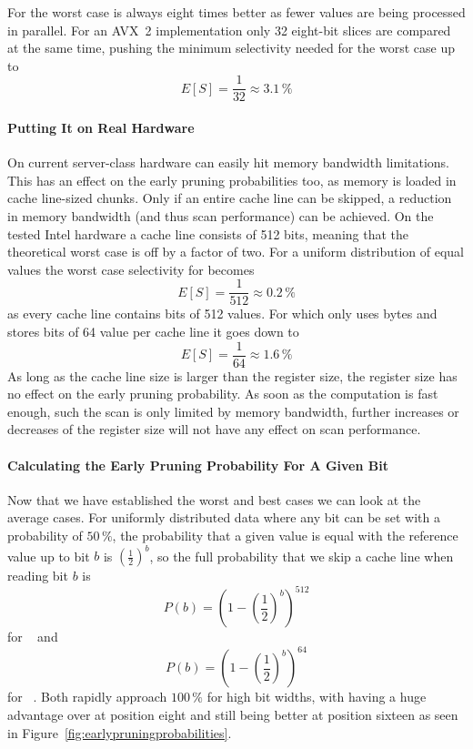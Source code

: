 For \bs{} the worst case is always eight times better as fewer values are being
processed in parallel. For an AVX~2 implementation only 32 eight-bit slices are
compared at the same time, pushing the minimum selectivity needed for the worst
case up to $$E[S]=\frac{1}{32}\approx 3.1\,\%$$

\paragraph{Putting It on Real Hardware}

On current server-class hardware \bwv{} can easily hit memory bandwidth
limitations. This has an effect on the early pruning probabilities too, as
memory is loaded in cache line-sized chunks. Only if an entire cache line can
be skipped, a reduction in memory bandwidth (and thus scan performance) can be
achieved. On the tested Intel hardware a cache line consists of 512 bits,
meaning that the theoretical worst case is off by a factor of two. For a uniform
distribution of equal values the worst case selectivity for \bwv{} becomes
$$E[S]=\frac{1}{512}\approx 0.2\,\%$$ as every cache line contains bits of 512
values. For \bs{} which only uses bytes and stores bits of 64 value per cache
line it goes down to $$E[S]=\frac{1}{64}\approx 1.6\,\%$$ As long as the cache
line size is larger than the register size, the register size has no effect on
the early pruning probability. As soon as the computation is fast enough, such
the scan is only limited by memory bandwidth, further increases or decreases of
the register size will not have any effect on scan performance.

\paragraph{Calculating the Early Pruning Probability For A Given Bit}

Now that we have established the worst and best cases we can look at the
average cases. For uniformly distributed data where any bit can be set with a
probability of $50\,\%$, the probability that a given value is equal with the
reference value up to bit $b$ is ${\left(\frac{1}{2}\right)}^b$,
so the full probability that we skip a cache line when reading bit $b$ is
$$P(b)={\left(1-{\left(\frac{1}{2}\right)}^b\right)}^{512}$$
for \bwv{}~\cite{BitWeaving} and
$$P(b)={\left(1-{\left(\frac{1}{2}\right)}^b\right)}^{64}$$
for \bs{}~\cite{ByteSlice}. Both rapidly approach $100\,\%$ for high bit widths,
with \bs{} having a huge advantage over \bwv{} at position eight and still being
better at position sixteen as seen in
Figure~\ref{fig:earlypruningprobabilities}.

